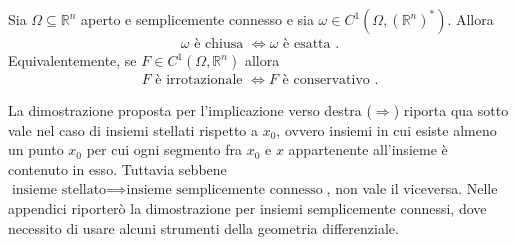 \begin{theorem}
	Sia $\Omega \subseteq \mathbb{R}^n$ aperto e semplicemente connesso e sia $\omega \in C^1(\Omega, (\mathbb{R}^n)^*)$. Allora
	\begin{align*}
		\omega \text{ è chiusa } \iff \omega \text{ è esatta }. 
	\end{align*}
	Equivalentemente, se $F \in C^1(\Omega, \mathbb{R}^n)$ allora
	\begin{align*}
		F \text{ è irrotazionale } \iff F \text{ è conservativo }.
	\end{align*}
\end{theorem}
La dimostrazione proposta per l'implicazione verso destra ($\Rightarrow$) riporta qua sotto vale nel caso di insiemi stellati rispetto a $x_0$, ovvero insiemi in cui esiste almeno un punto $x_0$ per cui ogni segmento fra $x_0$ e $x$ appartenente all'insieme è contenuto in esso. Tuttavia sebbene $\text{insieme stellato} \implies \text{insieme semplicemente connesso}$, non vale il viceversa.
Nelle appendici riporterò la dimostrazione per insiemi semplicemente connessi, dove necessito di usare alcuni strumenti della geometria differenziale.
